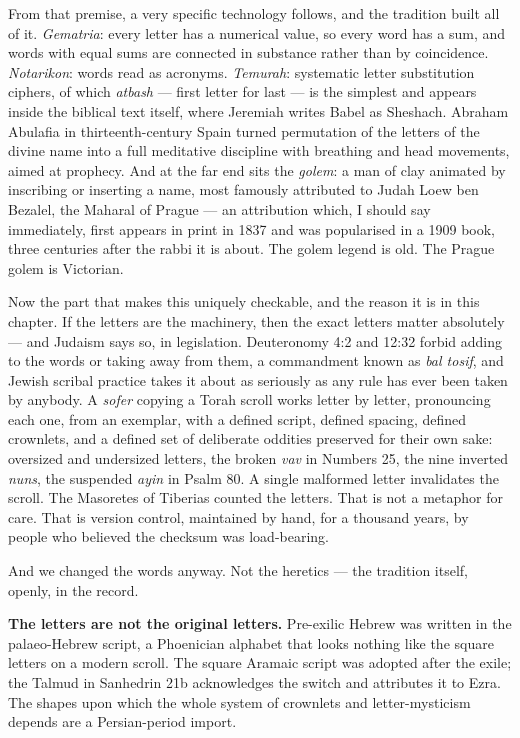 From that premise, a very specific technology follows, and the tradition built all of it.
\emph{Gematria}: every letter has a numerical value, so every word has a sum, and words with equal
sums are connected in substance rather than by coincidence. \emph{Notarikon}: words read as
acronyms. \emph{Temurah}: systematic letter substitution ciphers, of which
\emph{atbash} --- first letter for last --- is the simplest and appears inside the biblical text
itself, where Jeremiah writes Babel as Sheshach. Abraham Abulafia in
thirteenth-century Spain turned permutation of the letters of the divine name into a full
meditative discipline with breathing and head movements, aimed at prophecy. And at the far end sits
the \emph{golem}: a man of clay animated by inscribing or inserting a name, most famously
attributed to Judah Loew ben Bezalel, the Maharal of Prague --- an attribution which, I should
say immediately, first appears in print in 1837 and was popularised in a 1909 book, three centuries
after the rabbi it is about. The golem legend is old. The Prague golem is Victorian.

Now the part that makes this uniquely checkable, and the reason it is in this chapter. If the
letters are the machinery, then the exact letters matter absolutely --- and Judaism says so, in
legislation. Deuteronomy 4:2 and 12:32 forbid adding to the words or taking away from them, a
commandment known as \emph{bal tosif}, and Jewish scribal practice takes it about as seriously as
any rule has ever been taken by anybody. A \emph{sofer} copying a Torah scroll works letter by
letter, pronouncing each one, from an exemplar, with a defined script, defined spacing, defined
crownlets, and a defined set of deliberate oddities preserved for their own sake: oversized and
undersized letters, the broken \emph{vav} in Numbers 25, the nine inverted \emph{nuns}, the
suspended \emph{ayin} in Psalm 80. A single malformed letter invalidates the scroll. The Masoretes
of Tiberias counted the letters. That is not a metaphor for care. That is version control,
maintained by hand, for a thousand years, by people who believed the checksum was load-bearing.

And we changed the words anyway. Not the heretics --- the tradition itself, openly, in the
record.

\textbf{The letters are not the original letters.} Pre-exilic Hebrew was written in the
palaeo-Hebrew script, a Phoenician alphabet that looks nothing like the square letters on a modern
scroll. The square Aramaic script was adopted after the exile; the Talmud in Sanhedrin 21b
acknowledges the switch and attributes it to Ezra. The shapes upon which the whole system of
crownlets and letter-mysticism depends are a Persian-period import.


